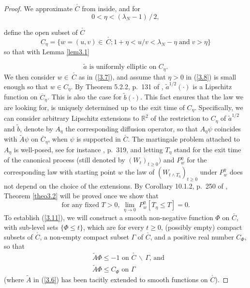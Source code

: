 \documentclass[12pt,leqno]{article}
\def\IR{{\mathbb R}}
\def\n{\noindent}
\def\ov{\overline}
\def\r{\rightarrow}
\def\wt{\widetilde}
\begin{document}
\begin{proof}
We approximate $\stackrel{_\circ}{C}$ from inside, and for
\begin{equation}\label{3.8}
0 < \eta < (\lambda_N - 1) \, / \, 2,
\end{equation}

\vspace{-1ex}\n
define the open subset of $\stackrel{_\circ}{C}$
\begin{equation}\label{3.9}
C_\eta = \{w = (u,v) \in \, \stackrel{_\circ}{C}; 1 + \eta < u / v < \lambda_N - \eta \;\mbox{and} \; v > \eta\}
\end{equation}
so that with Lemma \ref{lem3.1}

\vspace{-4ex}
\begin{equation}\label{3.10}
\mbox{$\wt{a}$ is uniformly elliptic on $C_\eta$}.
\end{equation}
We then consider $w \in\, \stackrel{_\circ}{C}$ as in (\ref{3.7}), and assume that $\eta > 0$ in (\ref{3.8}) is small enough so that $w \in C_\eta$. By Theorem 5.2.2, p.~131 of \cite{StroVara79}, $\wt{a}^{1/2}(\cdot)$ is a Lipschitz function on $\ov{C}\!_\eta$. This is also the case for $\wt{b}(\cdot)$. This fact ensures that the law we are looking for, is uniquely determined up to the exit time of $C_\eta$. Specifically, we can consider arbitrary Lipschitz extensions to $\IR^2$ of the restriction to $C_\eta$ of $\wt{a}^{1/2}$ and $\wt{b}$, denote by $A_\eta$ the corresponding diffusion operator, so that $A_\eta \psi$ coincides with $\wt{A} \psi$ on $\ov{C}\!_\eta$, when $\psi$ is supported in $\stackrel{_\circ}{C}$. The martingale problem attached to $A_\eta$ is well-posed, see for instance \cite{KaraShre88}, p.~319, and letting $T_\eta$ stand for the exit time of the canonical process (still denoted by $(W_t)_{t \ge 0})$ and $P^\eta_w$ for the corresponding law with starting point $w$ the law of $(W_{t \wedge T_\eta})_{t \ge 0}$ under $P^\eta_w$ does not depend on the choice of the extensions. By Corollary 10.1.2, p.~250 of \cite{StroVara79}, Theorem \ref{theo3.2} will be proved once we show that
\begin{equation}\label{3.11}
\mbox{for any fixed $T > 0$, $\lim\limits_{\eta \r 0} \, P^\eta_w [T_\eta \le T] = 0$}.
\end{equation}
To establish (\ref{3.11}), we will construct a smooth non-negative function $\Phi$ on $\stackrel{_\circ}{C}$, with sub-level sets $\{\Phi \le t\}$, which are for every $t \ge 0$, (possibly empty) compact subsets of $\stackrel{_\circ}{C}$, a non-empty compact subset $\Gamma$ of $\stackrel{_\circ}{C}$, and a positive real number $C_\Phi$, so that
\begin{align}
& \mbox{$\wt{A} \Phi \le -1$ on $\stackrel{_\circ}{C} \, \backslash \, \Gamma$, and} \label{3.12}
\\[1ex]
& \mbox{$\wt{A} \Phi \le C_\Phi$ on $\Gamma$} \label{3.13}
\end{align}
(where $\wt{A}$ in (\ref{3.6}) has been tacitly extended to smooth functions on $\stackrel{_\circ}{C}$).


\end{proof}
\end{document}

